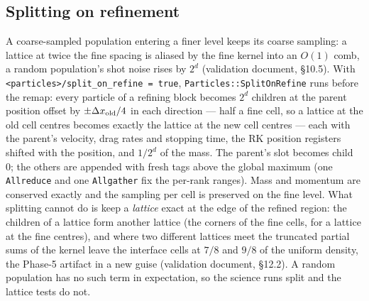 \documentclass[11pt]{article}
\newcommand{\code}[1]{\texttt{#1}}
\newcommand{\fn}[1]{\texttt{\small #1}}
\begin{document}
\subsection{Splitting on refinement}

A coarse-sampled population entering a finer level keeps its coarse sampling: a lattice
at twice the fine spacing is aliased by the fine kernel into an $O(1)$ comb, a random
population's shot noise rises by $2^d$ (validation document, \S10.5). With
\code{<particles>/split\_on\_refine = true}, \fn{Particles::SplitOnRefine} runs before
the remap: every particle of a refining block becomes $2^d$ children at the parent
position offset by $\pm\Delta x_{\rm old}/4$ in each direction --- half a fine cell, so a
lattice at the old cell centres becomes exactly the lattice at the new cell centres ---
each with the parent's velocity, drag rates and stopping time, the RK position registers
shifted with the position, and $1/2^d$ of the mass. The parent's slot becomes child 0; the
others are appended with fresh tags above the global maximum (one \code{Allreduce} and
one \code{Allgather} fix the per-rank ranges). Mass and momentum are conserved exactly and
the sampling per cell is preserved on the fine level. What splitting cannot do is keep a
\emph{lattice} exact at the edge of the refined region: the children of a lattice form
another lattice (the corners of the fine cells, for a lattice at the fine centres), and
where two different lattices meet the truncated partial sums of the kernel leave the
interface cells at $7/8$ and $9/8$ of the uniform density, the Phase-5 artifact in a new
guise (validation document, \S12.2). A random population has no such term in
expectation, so the science runs split and the lattice tests do not.
\end{document}
